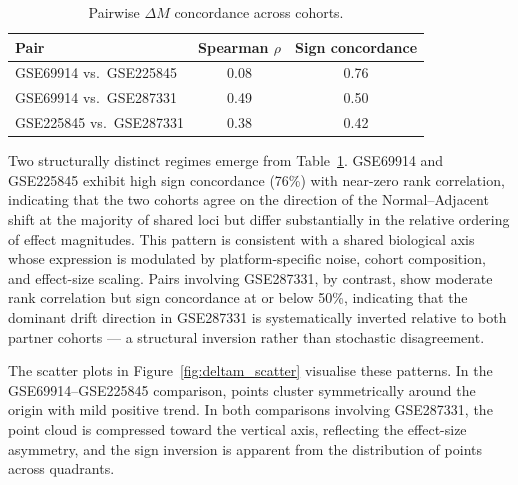 \begin{table}[H]
\centering
\caption{Pairwise $\Delta M$ concordance across cohorts.}
\label{tab:pairwise_concordance}
\begin{tabular}{lcc}
\toprule
Pair & Spearman $\rho$ & Sign concordance \\
\midrule
GSE69914 vs.\ GSE225845  & 0.08 & 0.76 \\
GSE69914 vs.\ GSE287331  & 0.49 & 0.50 \\
GSE225845 vs.\ GSE287331 & 0.38 & 0.42 \\
\bottomrule
\end{tabular}
\end{table}

Two structurally distinct regimes emerge from
Table~\ref{tab:pairwise_concordance}. GSE69914 and
GSE225845 exhibit high sign concordance (76\%) with
near-zero rank correlation, indicating that the two cohorts
agree on the direction of the Normal--Adjacent shift at the
majority of shared loci but differ substantially in the
relative ordering of effect magnitudes. This pattern is
consistent with a shared biological axis whose expression
is modulated by platform-specific noise, cohort composition,
and effect-size scaling. Pairs involving GSE287331, by
contrast, show moderate rank correlation but sign
concordance at or below 50\%, indicating that the dominant
drift direction in GSE287331 is systematically inverted
relative to both partner cohorts — a structural inversion
rather than stochastic disagreement.

The scatter plots in Figure~\ref{fig:deltam_scatter}
visualise these patterns. In the GSE69914--GSE225845
comparison, points cluster symmetrically around the origin
with mild positive trend. In both comparisons involving
GSE287331, the point cloud is compressed toward the
vertical axis, reflecting the effect-size asymmetry, and
the sign inversion is apparent from the distribution of
points across quadrants.

